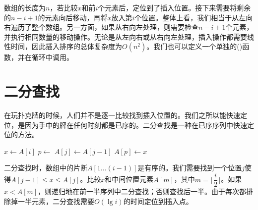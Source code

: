 \documentclass[b5paper]{ctexart}
\begin{document}
数组的长度为$n$，若比较$x$和前$i$个元素后，定位到了插入位置。接下来需要将剩余的$n - i + 1$的元素向后移动，再将$x$放入第$i$个位置。整体上看，我们相当于从左向右遍历了整个数组。另一方面，如果从右向左处理，则需要检查$n - i + 1$个元素，并执行相同数量的移动操作。无论是从左向右或从右向左处理，插入操作都需要线性时间，因此插入排序的总体复杂度为$O(n^2)$。我们也可以定义一个单独的()函数，并在循环中调用。

\begin{Exercise}[label={ex:isort-insert}]
\end{Exercise}

\begin{Answer}[ref = {ex:isort-insert}]
\end{Answer}

\section{二分查找}

在玩扑克牌的时候，人们并不是逐一比较找到插入位置的。我们之所以能快速定位，是因为手中的牌在任何时刻都是已序的。二分查找是一种在已序序列中快速定位的方法。

\begin{algorithmic}[1]
    \State $x \gets A[i]$
    \State $p \gets $ 
      \State $A[j] \gets A[j-1]$
    \EndFor
    \State $A[p] \gets x$
  \EndFor
\EndFunction
\end{algorithmic}

二分查找时，数组中的片断$A[1...(i-1)]$是有序的。我们需要找到一个位置$j$使得$A[j-1] \leq x \leq A[j]$。比较$x$和中间位置元素$A[m]$，其中$m = \lfloor \dfrac{i}{2} \rfloor$。如果$x < A[m]$，则递归地在前一半序列中二分查找；否则查找后一半。由于每次都排除掉一半元素，二分查找需要$O(\lg i)$的时间定位到插入点。
\end{document}
